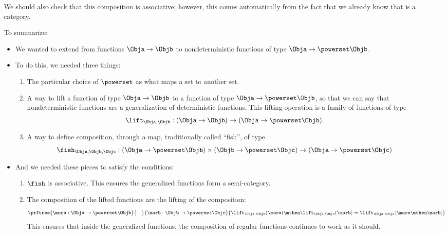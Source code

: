 We should also check that this composition is associative; however, this comes automatically from the fact that we already know that \Rel is a category. 

To summarize: 
\begin{itemize}
    \item We wanted to extend \Set from functions $\Obja \to \Objb$ to nondeterministic functions of type $\Obja \to \powerset\Objb$.
    \item To do this, we needed three things:
    \begin{enumerate}
        \item The particular choice of $\powerset$ as what maps a set to another set. 
    \item A way to lift a function of type $\Obja \to \Objb$ to a function of type $\Obja \to \powerset\Objb$, so that we can say that nondeterministic functions are a generalization of deterministic functions. This lifting operation is a family of functions of type 
    \begin{equation}\label{eq:monad-lift}
        \lift_{\Obja, \Objb}: (\Obja \to \Objb) \to (\Obja \to \powerset\Objb).
    \end{equation}
    \item A way to define composition, through a map, traditionally called ``fish'', of type
    \begin{equation}\label{eq:monad-fish}
        \fish_{\Obja, \Objb, \Objc}: (\Obja \to \powerset\Objb) \times (\Objb \to \powerset\Objc) 
        \to (\Obja \to \powerset \Objc)
    \end{equation}
\end{enumerate}
\item And we needed these pieces to satisfy the conditions:
\begin{enumerate}
    \item $\fish$ is associative. This ensures the generalized functions form a semi-category.
    \item The composition of the lifted functions are the lifting of the composition:
    \begin{equation}\label{eq:monad-fish-associative}
        \prftree{\mora: \Obja \to \powerset\Objb}{\quad}{\morb: \Objb \to \powerset \Objc}{
        \lift_{\Obja,\Objb}(\mora)\mthen\lift_{\Objb,\Objc}(\morb) =  \lift_{\Obja,\Objc}(\mora\mthen\morb)}
    \end{equation}
    This ensures that inside the generalized functions, the composition of regular functions continues to work as it should.
\end{enumerate}
\end{itemize}

